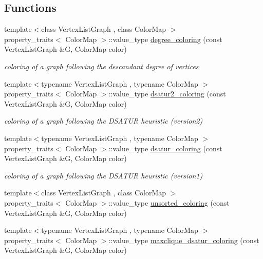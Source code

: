 \subsection*{Functions}
\begin{DoxyCompactItemize}
\item 
{\footnotesize template$<$class Vertex\+List\+Graph , class Color\+Map $>$ }\\property\+\_\+traits$<$ Color\+Map $>$\+::value\+\_\+type \hyperlink{namespaceboost_a78c0b54ba26e1079abb19d6cca78c8e8}{degree\+\_\+coloring} (const Vertex\+List\+Graph \&G, Color\+Map color)
\begin{DoxyCompactList}\small\item\em coloring of a graph following the descandant degree of vertices \end{DoxyCompactList}\item 
{\footnotesize template$<$typename Vertex\+List\+Graph , typename Color\+Map $>$ }\\property\+\_\+traits$<$ Color\+Map $>$\+::value\+\_\+type \hyperlink{namespaceboost_a609873070b85df59333adc0769a99f6e}{dsatur2\+\_\+coloring} (const Vertex\+List\+Graph \&G, Color\+Map color)
\begin{DoxyCompactList}\small\item\em coloring of a graph following the D\+S\+A\+T\+UR heuristic (version2) \end{DoxyCompactList}\item 
{\footnotesize template$<$typename Vertex\+List\+Graph , typename Color\+Map $>$ }\\property\+\_\+traits$<$ Color\+Map $>$\+::value\+\_\+type \hyperlink{namespaceboost_af2fc5e009a055618e84aaacf8b9a0842}{dsatur\+\_\+coloring} (const Vertex\+List\+Graph \&G, Color\+Map color)
\begin{DoxyCompactList}\small\item\em coloring of a graph following the D\+S\+A\+T\+UR heuristic (version1) \end{DoxyCompactList}\item 
{\footnotesize template$<$class Vertex\+List\+Graph , class Color\+Map $>$ }\\property\+\_\+traits$<$ Color\+Map $>$\+::value\+\_\+type \hyperlink{namespaceboost_aa5d4da27fc701c66bcda76bd3735eb05}{unsorted\+\_\+coloring} (const Vertex\+List\+Graph \&G, Color\+Map color)
\item 
{\footnotesize template$<$typename Vertex\+List\+Graph , typename Color\+Map $>$ }\\property\+\_\+traits$<$ Color\+Map $>$\+::value\+\_\+type \hyperlink{namespaceboost_a45bad415b0b5ee0369090a1108f6066d}{maxclique\+\_\+dsatur\+\_\+coloring} (const Vertex\+List\+Graph \&G, Color\+Map color)
\end{DoxyCompactItemize}


